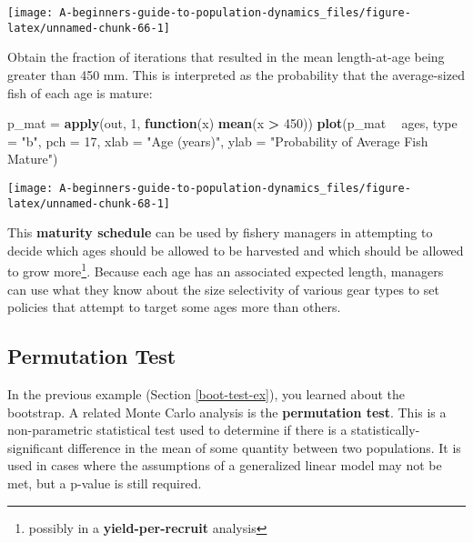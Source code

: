 \documentclass[]{book}
\newenvironment{Shaded}{\begin{snugshade}}{\end{snugshade}}
\newcommand{\ControlFlowTok}[1]{\textcolor[rgb]{0.13,0.29,0.53}{\textbf{#1}}}
\newcommand{\DataTypeTok}[1]{\textcolor[rgb]{0.13,0.29,0.53}{#1}}
\newcommand{\DecValTok}[1]{\textcolor[rgb]{0.00,0.00,0.81}{#1}}
\newcommand{\KeywordTok}[1]{\textcolor[rgb]{0.13,0.29,0.53}{\textbf{#1}}}
\newcommand{\NormalTok}[1]{#1}
\newcommand{\OperatorTok}[1]{\textcolor[rgb]{0.81,0.36,0.00}{\textbf{#1}}}
\newcommand{\StringTok}[1]{\textcolor[rgb]{0.31,0.60,0.02}{#1}}
\let\rmarkdownfootnote\footnote%
\def\footnote{\protect\rmarkdownfootnote}
\begin{document}
\begin{center}\texttt{[image: A-beginners-guide-to-population-dynamics\_files/figure-latex/unnamed-chunk-66-1]} \end{center}

Obtain the fraction of iterations that resulted in the mean length-at-age being greater than 450 mm. This is interpreted as the probability that the average-sized fish of each age is mature:

\begin{Shaded}
\begin{Highlighting}[]
\NormalTok{p_mat =}\StringTok{ }\KeywordTok{apply}\NormalTok{(out, }\DecValTok{1}\NormalTok{, }\ControlFlowTok{function}\NormalTok{(x) }\KeywordTok{mean}\NormalTok{(x }\OperatorTok{>}\StringTok{ }\DecValTok{450}\NormalTok{))}
\KeywordTok{plot}\NormalTok{(p_mat }\OperatorTok{~}\StringTok{ }\NormalTok{ages, }\DataTypeTok{type =} \StringTok{"b"}\NormalTok{, }\DataTypeTok{pch =} \DecValTok{17}\NormalTok{,}
     \DataTypeTok{xlab =} \StringTok{"Age (years)"}\NormalTok{, }\DataTypeTok{ylab =} \StringTok{"Probability of Average Fish Mature"}\NormalTok{)}
\end{Highlighting}
\end{Shaded}

\begin{center}\texttt{[image: A-beginners-guide-to-population-dynamics\_files/figure-latex/unnamed-chunk-68-1]} \end{center}

This \textbf{maturity schedule} can be used by fishery managers in attempting to decide which ages should be allowed to be harvested and which should be allowed to grow more\footnote{possibly in a \textbf{yield-per-recruit} analysis}. Because each age has an associated expected length, managers can use what they know about the size selectivity of various gear types to set policies that attempt to target some ages more than others.

\hypertarget{perm-test-ex}{%
\subsection{Permutation Test}\label{perm-test-ex}}

In the previous example (Section \ref{boot-test-ex}), you learned about the bootstrap. A related Monte Carlo analysis is the \textbf{permutation test}. This is a non-parametric statistical test used to determine if there is a statistically-significant difference in the mean of some quantity between two populations. It is used in cases where the assumptions of a generalized linear model may not be met, but a p-value is still required.
\end{document}

